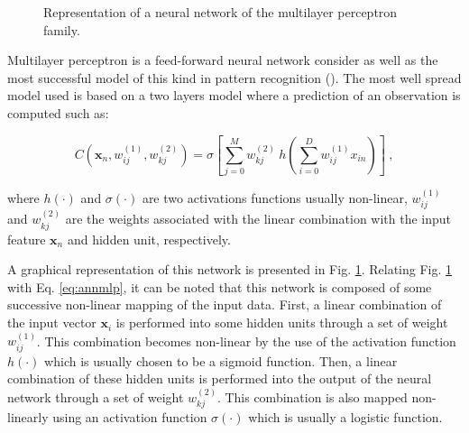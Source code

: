 \begin{enumerate}[leftmargin=*]
\begin{figure}
\caption{Representation of a neural network of the multilayer perceptron family.}
\label{fig:mlp}
\end{figure}

Multilayer perceptron is a feed-forward neural network consider as well as the most successful model of this kind in pattern recognition (\cite{Bishop2006}). The most well spread model used is based on a two layers model where a prediction of an observation is computed such as:

\begin{equation}
	C(\mathbf{x}_n,w_{ij}^{(1)},w_{kj}^{(2)}) = \sigma \left[ \sum_{j=0}^{M} w_{kj}^{(2)} \  h \left( \sum_{i=0}^{D} w_{ij}^{(1)} x_{in} \right) \right] \ ,
	\label{eq:annmlp}
\end{equation}

\noindent where $h(\cdot)$ and $\sigma(\cdot)$ are two activations functions usually non-linear, $w_{ij}^{(1)}$ and $ w_{kj}^{(2)}$ are the weights associated with the linear combination with the input feature $\mathbf{x}_n$ and hidden unit, respectively.

A graphical representation of this network is presented in Fig. \ref{fig:mlp}. Relating Fig. \ref{fig:mlp} with Eq. \eqref{eq:annmlp}, it can be noted that this network is composed of some successive non-linear mapping of the input data. First, a linear combination of the input vector $\mathbf{x}_i$ is performed into some hidden units through a set of weight $w_{ij}^{(1)}$. This combination becomes non-linear by the use of the activation function $h(\cdot)$ which is usually chosen to be a sigmoid function. Then, a linear combination of these hidden units is performed into the output of the neural network through a set of weight $w_{kj}^{(2)}$. This combination is also mapped non-linearly using an activation function $\sigma(\cdot)$ which is usually a logistic function.


\end{enumerate}
